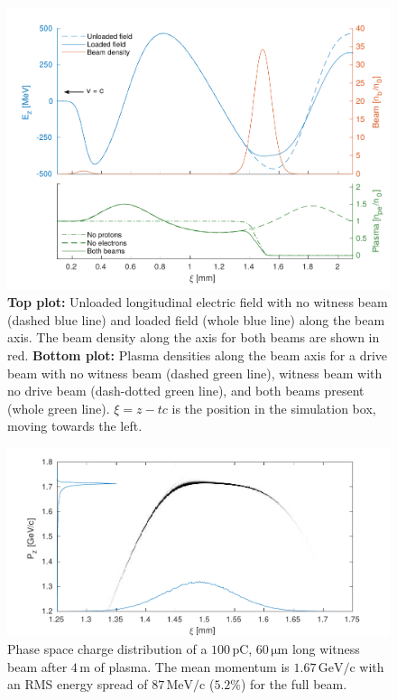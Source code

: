 \documentclass[aps,prstab,reprint,amsmath,amssymb,groupedaddress]{revtex4-1}
\newcommand{\unit}[1]{\,\mathrm{#1}}
\begin{document}
\begin{figure}[hbt]
    \includegraphics[width=\linewidth,trim={2mm 0mm 2mm 0mm},clip]{figures/beamLoading}
    \caption{\label{Fig:BeamLoading} \textbf{Top plot:} Unloaded longitudinal electric field with no witness beam
        (dashed blue line) and loaded field (whole blue line) along the beam axis. The beam density along the axis for
        both beams are shown in red.
        \textbf{Bottom plot:} Plasma densities along the beam axis for a drive beam with no witness beam (dashed green
        line), witness beam with no drive beam (dash-dotted green line), and both beams present (whole green line).
        $\xi = z - tc$ is the position in the simulation box, moving towards the left.}
\end{figure}

\begin{figure}[hbt]
    \includegraphics[width=\linewidth,trim={2mm 0mm 2mm 0mm},clip]{figures/beamPhaseSpace}
    \caption{\label{Fig:BeamPS} Phase space charge distribution of a $100\unit{pC}$, $60\unit{\mu m}$ long witness beam
        after $4\unit{m}$ of plasma. The mean momentum is $1.67\unit{GeV/c}$ with an RMS energy spread
        of $87\unit{MeV/c}$ ($5.2\%$) for the full beam.}
\end{figure}
\end{document}

